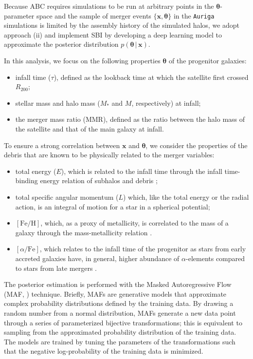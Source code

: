 Because ABC requires simulations to be run at arbitrary points in the $\bm{\theta}$-parameter space and the sample of merger events $\{\bm{x}, \bm{\theta}\}$ in the \texttt{Auriga} simulations is limited by the assembly history of the simulated halos,  we adopt approach (ii) and implement SBI by developing a deep learning model to approximate the posterior distribution $p(\bm{\theta} \, | \, \bm{x})$.


In this analysis, we focus on the following properties $\bm{\theta}$ of the progenitor galaxies:

\begin{itemize}
    \item infall time ($\tau$), defined as the lookback time at which the satellite first crossed $R_{200}$;
    \item stellar mass and halo mass ($M_{*}$ and $M$, respectively) at infall;
    \item the merger mass ratio (MMR), defined as the ratio between the halo mass of the satellite and that of the main galaxy at infall. 
\end{itemize}

To ensure a strong correlation between $\bm{x}$ and $\bm{\theta}$, we consider the properties of the debris that are known to be physically related to the merger variables: 

\begin{itemize}
    \item total energy ($E$), which is related to the infall time through the infall time-binding energy relation of subhalos and debris \citep{Rocha2012,GarciaBethencourt2023};
    \item total specific angular momentum ($L$) which, like the total energy or the radial action, is an integral of motion for a star in a spherical potential;
    \item $[\text{Fe}/\text{H}]$, which, as a proxy of metallicity, is correlated to the mass of a galaxy through the mass-metallicity relation \citep{Harmsen2017}.
    \item $[\alpha/\text{Fe}]$, which relates to the infall time of the progenitor as stars from early accreted galaxies have, in general, higher abundance of $\alpha$-elements compared to stars from late mergers \citep{Font2006a}.
\end{itemize}


The posterior estimation is performed with the Masked Autoregressive Flow (MAF, \citealt{Papamakarios2017}) technique. Briefly, MAFs are generative models that approximate complex probability distributions defined by the training data. By drawing a random number from a normal distribution, MAFs generate a new data point through a series of parameterized bijective transformations; this is equivalent to sampling from the approximated probability distribution of the training data. The models are trained by tuning the parameters of the transformations such that the negative log-probability of the training data is minimized. 

